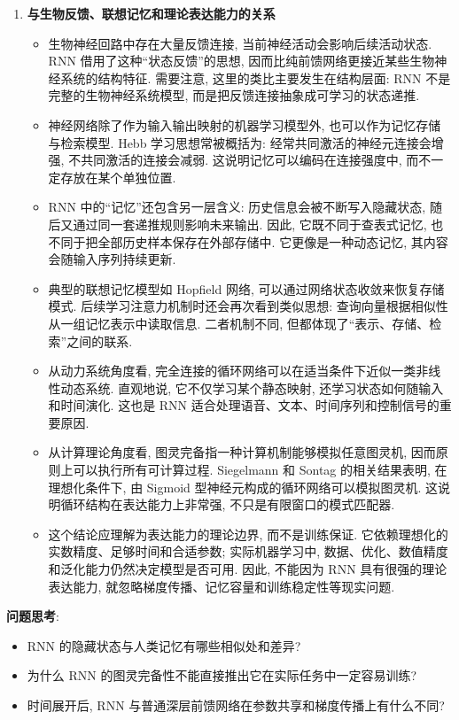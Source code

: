 \documentclass{../nndlcourse}
\begin{document}
\begin{enumerate}
  \item \textbf{与生物反馈、联想记忆和理论表达能力的关系}
    \begin{itemize}
      \item 生物神经回路中存在大量反馈连接, 当前神经活动会影响后续活动状态. RNN 借用了这种“状态反馈”的思想, 因而比纯前馈网络更接近某些生物神经系统的结构特征. 需要注意, 这里的类比主要发生在结构层面: RNN 不是完整的生物神经系统模型, 而是把反馈连接抽象成可学习的状态递推.
      \item 神经网络除了作为输入输出映射的机器学习模型外, 也可以作为记忆存储与检索模型. Hebb 学习思想常被概括为: 经常共同激活的神经元连接会增强, 不共同激活的连接会减弱. 这说明记忆可以编码在连接强度中, 而不一定存放在某个单独位置.
      \item RNN 中的“记忆”还包含另一层含义: 历史信息会被不断写入隐藏状态, 随后又通过同一套递推规则影响未来输出. 因此, 它既不同于查表式记忆, 也不同于把全部历史样本保存在外部存储中. 它更像是一种动态记忆, 其内容会随输入序列持续更新.
      \item 典型的联想记忆模型如 Hopfield 网络, 可以通过网络状态收敛来恢复存储模式. 后续学习注意力机制时还会再次看到类似思想: 查询向量根据相似性从一组记忆表示中读取信息. 二者机制不同, 但都体现了“表示、存储、检索”之间的联系.
      \item 从动力系统角度看, 完全连接的循环网络可以在适当条件下近似一类非线性动态系统. 直观地说, 它不仅学习某个静态映射, 还学习状态如何随输入和时间演化. 这也是 RNN 适合处理语音、文本、时间序列和控制信号的重要原因.
      \item 从计算理论角度看, 图灵完备指一种计算机制能够模拟任意图灵机, 因而原则上可以执行所有可计算过程. Siegelmann 和 Sontag 的相关结果表明, 在理想化条件下, 由 Sigmoid 型神经元构成的循环网络可以模拟图灵机. 这说明循环结构在表达能力上非常强, 不只是有限窗口的模式匹配器.
      \item 这个结论应理解为表达能力的理论边界, 而不是训练保证. 它依赖理想化的实数精度、足够时间和合适参数; 实际机器学习中, 数据、优化、数值精度和泛化能力仍然决定模型是否可用. 因此, 不能因为 RNN 具有很强的理论表达能力, 就忽略梯度传播、记忆容量和训练稳定性等现实问题.
    \end{itemize}
\end{enumerate}

\textbf{问题思考}:
\begin{itemize}
  \item RNN 的隐藏状态与人类记忆有哪些相似处和差异?
  \item 为什么 RNN 的图灵完备性不能直接推出它在实际任务中一定容易训练?
  \item 时间展开后, RNN 与普通深层前馈网络在参数共享和梯度传播上有什么不同?
\end{itemize}
\end{document}
